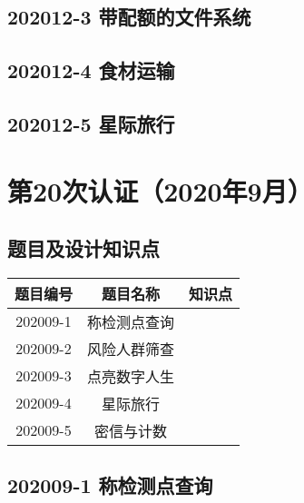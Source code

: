 \documentclass[cn,10pt,math=newtx,citestyle=gb7714-2015,bibstyle=gb7714-2015]{elegantbook}
\newif\ifonlyanalyze %
\begin{document}
\newpage
\section{202012-3 带配额的文件系统}
\ifonlyanalyze
\else
    
\fi


\newpage
\section{202012-4 食材运输}
\ifonlyanalyze
\else
    
\fi


\newpage
\section{202012-5 星际旅行}
\ifonlyanalyze
\else
    
\fi



\chapter{第20次认证（2020年9月）}

\section{题目及设计知识点}

\begin{table}[htbp]
    \centering
    \begin{tabular}{ccc}
        \toprule
        题目编号 & 题目名称     & 知识点 \\
        \midrule
        202009-1 & 称检测点查询 &        \\
        202009-2 & 风险人群筛查 &        \\
        202009-3 & 点亮数字人生 &        \\
        202009-4 & 星际旅行     &        \\
        202009-5 & 密信与计数   &        \\
        \bottomrule
    \end{tabular}
\end{table}

\newpage
\section{202009-1 称检测点查询}
\ifonlyanalyze
\else
    
\fi

\end{document}
